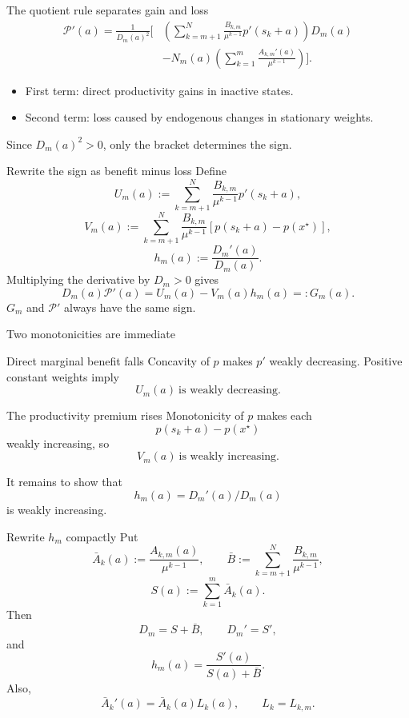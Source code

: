 \documentclass[aspectratio=169,10pt]{beamer}
\newcommand{\calP}{\mathcal{P}}
\begin{document}
\begin{frame}{The quotient rule separates gain and loss}
\small
\begin{align*}
\calP'(a)=\frac{1}{D_m(a)^2}
\Bigg[
&
\left(
\sum_{k=m+1}^N
\frac{B_{k,m}}{\mu^{k-1}}
p'(s_k+a)
\right)D_m(a)\\
&-
N_m(a)
\left(
\sum_{k=1}^m
\frac{A_{k,m}'(a)}{\mu^{k-1}}
\right)
\Bigg].
\end{align*}
\begin{itemize}
  \item First term: direct productivity gains in inactive states.
  \item Second term: loss caused by endogenous changes in stationary weights.
\end{itemize}
Since $D_m(a)^2>0$, only the bracket determines the sign.
\end{frame}

\begin{frame}{Rewrite the sign as benefit minus loss}
Define
\[
U_m(a):=
\sum_{k=m+1}^N
\frac{B_{k,m}}{\mu^{k-1}}p'(s_k+a),
\]
\[
V_m(a):=
\sum_{k=m+1}^N
\frac{B_{k,m}}{\mu^{k-1}}
[p(s_k+a)-p(x^\star)],
\]
\[
h_m(a):=\frac{D_m'(a)}{D_m(a)}.
\]
Multiplying the derivative by $D_m>0$ gives
\[
\boxed{
D_m(a)\calP'(a)
=U_m(a)-V_m(a)h_m(a)
=:G_m(a).}
\]
$G_m$ and $\calP'$ always have the same sign.
\end{frame}

\begin{frame}{Two monotonicities are immediate}
\begin{block}{Direct marginal benefit falls}
Concavity of $p$ makes $p'$ weakly decreasing. Positive constant weights imply
\[
U_m(a)\ \text{is weakly decreasing}.
\]
\end{block}
\begin{block}{The productivity premium rises}
Monotonicity of $p$ makes each
\[
p(s_k+a)-p(x^\star)
\]
weakly increasing, so
\[
V_m(a)\ \text{is weakly increasing}.
\]
\end{block}
It remains to show that
\[
h_m(a)=D_m'(a)/D_m(a)
\]
is weakly increasing.
\end{frame}

\begin{frame}{Rewrite \texorpdfstring{$h_m$}{hm} compactly}
Put
\[
\bar A_k(a):=
\frac{A_{k,m}(a)}{\mu^{k-1}},
\qquad
\bar B:=
\sum_{k=m+1}^N
\frac{B_{k,m}}{\mu^{k-1}},
\]
\[
S(a):=\sum_{k=1}^m\bar A_k(a).
\]
Then
\[
D_m=S+\bar B,
\qquad
D_m'=S',
\]
and
\[
\boxed{
h_m(a)=
\frac{S'(a)}{S(a)+\bar B}.}
\]
Also,
\[
\bar A_k'(a)=\bar A_k(a)L_k(a),
\qquad L_k=L_{k,m}.
\]
\end{frame}
\end{document}

